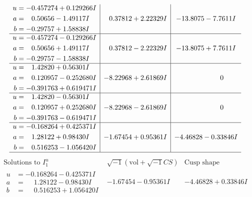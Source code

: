 \documentclass[1p]{elsarticle_modified}
\theoremstyle{definition}
\newcommand{\I}{\sqrt{-1}}
\begin{document}
$$\begin{array}{c|c|c}
\begin{aligned}
u &= -0.457274 + 0.129266 I \\
a &= \phantom{-}0.50656 - 1.49117 I \\
b &= -0.29757 + 1.58838 I\end{aligned}
 & \phantom{-}0.37812 + 2.22329 I & -13.8075 - 7.7611 I \\ \hline\begin{aligned}
u &= -0.457274 - 0.129266 I \\
a &= \phantom{-}0.50656 + 1.49117 I \\
b &= -0.29757 - 1.58838 I\end{aligned}
 & \phantom{-}0.37812 - 2.22329 I & -13.8075 + 7.7611 I \\ \hline\begin{aligned}
u &= \phantom{-}1.42820 + 0.56301 I \\
a &= \phantom{-}0.120957 - 0.252680 I \\
b &= -0.391763 + 0.619471 I\end{aligned}
 & -8.22968 + 2.61869 I & \phantom{-0.000000 } 0 \\ \hline\begin{aligned}
u &= \phantom{-}1.42820 - 0.56301 I \\
a &= \phantom{-}0.120957 + 0.252680 I \\
b &= -0.391763 - 0.619471 I\end{aligned}
 & -8.22968 - 2.61869 I & \phantom{-0.000000 } 0 \\ \hline\begin{aligned}
u &= -0.168264 + 0.425371 I \\
a &= \phantom{-}1.28122 + 0.98430 I \\
b &= \phantom{-}0.516253 - 1.056420 I\end{aligned}
 & -1.67454 + 0.95361 I & -4.46828 - 0.33846 I\\
 \hline 
 \end{array}$$\newpage$$\begin{array}{c|c|c}  
\text{Solutions to }I^u_{1}& \I (\text{vol} + \sqrt{-1}CS) & \text{Cusp shape}\\
 \hline 
\begin{aligned}
u &= -0.168264 - 0.425371 I \\
a &= \phantom{-}1.28122 - 0.98430 I \\
b &= \phantom{-}0.516253 + 1.056420 I\end{aligned}
 & -1.67454 - 0.95361 I & -4.46828 + 0.33846 I \\ \hline\begin{aligned}

\end{aligned}
\end{array}$$
\end{document}
